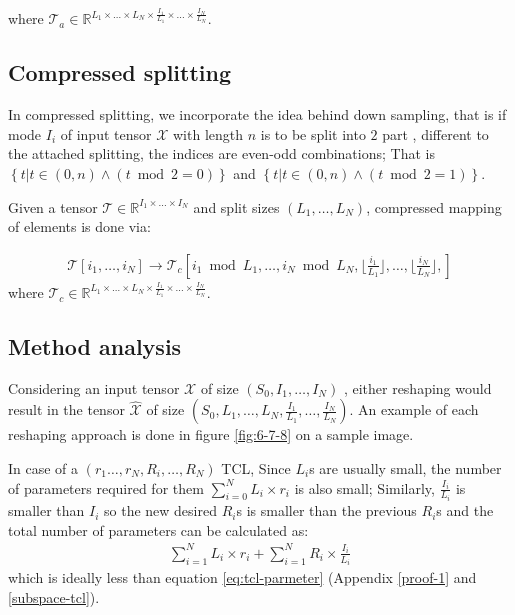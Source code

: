 \documentclass{article}
\begin{document}
where $\mathcal{T}_a \in \mathbb{R}^{L_1\times\dots\times L_N\times \frac{I_1}{L_1}\times\dots\times \frac{I_N}{L_N}}$.


\subsection{Compressed splitting}
\label{subsec:copressed-splitting}

In compressed splitting, we incorporate the idea behind down sampling, that is if mode $I_i$ of input tensor $\mathcal{X}$ with length $n$ is to be split into $2$ part , different to the attached splitting, the indices are even-odd combinations; That is $\left\{
t | t \in (0,n) \land 
\left(t\bmod{2} = 0\right)
\right\}$
and 
$\left\{
t | t \in (0,n) \land 
\left(t\bmod{2} = 1\right)
\right\}$.

Given a tensor $\mathcal{T} \in \mathbb{R}^{I_1\times\dots\times I_N}$ and split sizes 
$\left(L_1,\dots,L_N\right)$, compressed mapping of elements is done via:


\begin{align}
	\label{eq:map2}
	\mathcal{T}\left[i_1,\dots,i_N\right] \longrightarrow
	\mathcal{T}_c\left[
	i_1 \bmod{L_1},
	\dots,
	i_N \bmod{L_N},
	\lfloor\frac{i_1}{L_1}\rfloor,
	\dots,
	\lfloor\frac{i_N}{L_N}\rfloor,
	\right]
\end{align}
where $\mathcal{T}_c \in \mathbb{R}^{L_1\times\dots\times L_N\times \frac{I_1}{L_1}\times\dots\times \frac{I_N}{L_N}}$.

\subsection{Method analysis}
\label{subsec:method-analysis}
Considering an input tensor $\mathcal{X}$ of size
$(S_0,I_1,\dots,I_N)$
, either reshaping would result in the tensor $\hat{\mathcal{X}}$ of size
$(S_0,L_1,\dots,L_N,\frac{I_1}{L_1}, \dots, \frac{I_N}{L_N})$. An example of each reshaping approach is done in figure \ref{fig:6-7-8} on a sample image.

In case of a $(r_1\dots,r_N, R_i,\dots,R_N)$ TCL, Since $L_i$s are usually small, the number of parameters required for them $\sum_{i=0}^{N}L_i\times r_i$ is also small; Similarly, $\frac{I_i}{L_i}$ is smaller than $I_i$ so the new desired $R_i$s is smaller than the previous $R_i$s and the total number of parameters can be calculated as:
\begin{align}
	\label{eq:reshape-parameter-tcl}
	\sum_{i=1}^{N}L_i\times r_i + \sum_{i=1}^{N} R_i \times \frac{I_i}{L_i}
\end{align}
which is ideally less than equation \ref{eq:tcl-parmeter} (Appendix \ref{proof-1} and \ref{subspace-tcl}).
\end{document}
